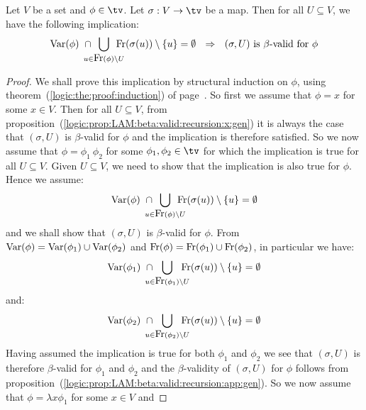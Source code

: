 \begin{prop}\label{logic:prop:LAM:var:inter:beta:valid:gen}
    Let $V$ be a set and $\phi\in\tv$. Let $\sigma:V\to\tv$ be a map. Then for
    all $U\subseteq V$, we have the following implication:
        \[
            \var(\phi)\ \cap
            \!\!\!\!\!\!\bigcup_{u\in\free(\phi)\setminus U}\!\!\!\!\!\!
            \free(\sigma(u))\setminus\{u\}
            =\emptyset
            \ \ \Rightarrow\ \ 
            \mbox{$(\sigma,U)$ is $\beta$-valid for $\phi$}
        \]
\end{prop}
\begin{proof}
    We shall prove this implication by structural induction on $\phi$, using 
    theorem~(\ref{logic:the:proof:induction}) of 
    page~\pageref{logic:the:proof:induction}. 
    So first we assume that $\phi=x$ for some $x\in V$. Then for all $U\subseteq 
    V$, from proposition~(\ref{logic:prop:LAM:beta:valid:recursion:x:gen}) it is
    always the case that $(\sigma, U)$ is $\beta$-valid for $\phi$ and the 
    implication is therefore satisfied. So we now assume that $\phi=\phi_{1}\ 
    \phi_{2}$ for some $\phi_{1},\phi_{2}\in\tv$ for which the implication
    is true for all $U\subseteq V$. Given $U\subseteq V$, we need to show that
    the implication is also true for $\phi$. Hence we assume:
        \begin{equation}\label{logic:eqn:LAM:var:inter:beta:valid:gen}
            \var(\phi)\ \cap
            \!\!\!\!\!\!\bigcup_{u\in\free(\phi)\setminus U}\!\!\!\!\!\!
            \free(\sigma(u))\setminus\{u\}
            =\emptyset
        \end{equation}
    and we shall show that $(\sigma,U)$ is $\beta$-valid for $\phi$.
    From $\mbox{\rm Var}(\phi)=\mbox{\rm Var}(\phi_{1})\cup\mbox{\rm Var}(\phi_{2})$
    and $\mbox{\rm Fr}(\phi)=\mbox{\rm Fr}(\phi_{1})\cup\mbox{\rm Fr}(\phi_{2})$, in particular
    we have:
        \[
            \var(\phi_{1})\ \cap
            \!\!\!\!\!\!\bigcup_{u\in\free(\phi_{1})\setminus U}\!\!\!\!\!\!
            \free(\sigma(u))\setminus\{u\}
            =\emptyset
        \]
    and: 
        \[
            \var(\phi_{2})\ \cap
            \!\!\!\!\!\!\bigcup_{u\in\free(\phi_{2})\setminus U}\!\!\!\!\!\!
            \free(\sigma(u))\setminus\{u\}
            =\emptyset
        \]
    Having assumed the implication is true for both $\phi_{1}$ and $\phi_{2}$ 
    we see that $(\sigma,U)$ is therefore $\beta$-valid for $\phi_{1}$ and 
    $\phi_{2}$ and the $\beta$-validity of $(\sigma,U)$ for $\phi$ follows 
    from proposition~(\ref{logic:prop:LAM:beta:valid:recursion:app:gen}).
    So we now assume that $\phi=\lambda x\phi_{1}$ for some $x\in V$ and

\end{proof}
